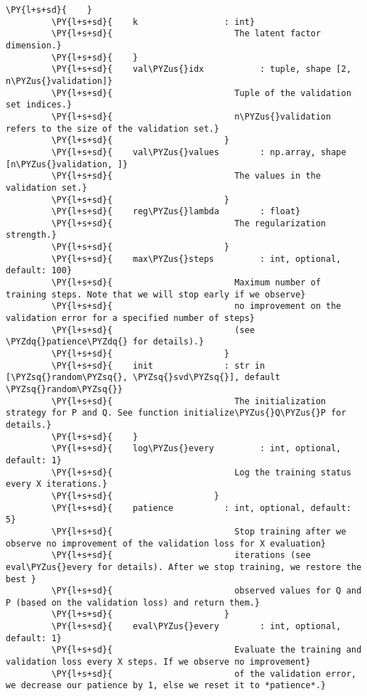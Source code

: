 \begin{Verbatim}[commandchars=\\\{\}]
         \PY{l+s+sd}{    }
         \PY{l+s+sd}{    k                 : int}
         \PY{l+s+sd}{                        The latent factor dimension.}
         \PY{l+s+sd}{    }
         \PY{l+s+sd}{    val\PYZus{}idx           : tuple, shape [2, n\PYZus{}validation]}
         \PY{l+s+sd}{                        Tuple of the validation set indices.}
         \PY{l+s+sd}{                        n\PYZus{}validation refers to the size of the validation set.}
         \PY{l+s+sd}{                      }
         \PY{l+s+sd}{    val\PYZus{}values        : np.array, shape [n\PYZus{}validation, ]}
         \PY{l+s+sd}{                        The values in the validation set.}
         \PY{l+s+sd}{                      }
         \PY{l+s+sd}{    reg\PYZus{}lambda        : float}
         \PY{l+s+sd}{                        The regularization strength.}
         \PY{l+s+sd}{                      }
         \PY{l+s+sd}{    max\PYZus{}steps         : int, optional, default: 100}
         \PY{l+s+sd}{                        Maximum number of training steps. Note that we will stop early if we observe}
         \PY{l+s+sd}{                        no improvement on the validation error for a specified number of steps}
         \PY{l+s+sd}{                        (see \PYZdq{}patience\PYZdq{} for details).}
         \PY{l+s+sd}{                      }
         \PY{l+s+sd}{    init              : str in [\PYZsq{}random\PYZsq{}, \PYZsq{}svd\PYZsq{}], default \PYZsq{}random\PYZsq{}}
         \PY{l+s+sd}{                        The initialization strategy for P and Q. See function initialize\PYZus{}Q\PYZus{}P for details.}
         \PY{l+s+sd}{    }
         \PY{l+s+sd}{    log\PYZus{}every         : int, optional, default: 1}
         \PY{l+s+sd}{                        Log the training status every X iterations.}
         \PY{l+s+sd}{                    }
         \PY{l+s+sd}{    patience          : int, optional, default: 5}
         \PY{l+s+sd}{                        Stop training after we observe no improvement of the validation loss for X evaluation}
         \PY{l+s+sd}{                        iterations (see eval\PYZus{}every for details). After we stop training, we restore the best }
         \PY{l+s+sd}{                        observed values for Q and P (based on the validation loss) and return them.}
         \PY{l+s+sd}{                      }
         \PY{l+s+sd}{    eval\PYZus{}every        : int, optional, default: 1}
         \PY{l+s+sd}{                        Evaluate the training and validation loss every X steps. If we observe no improvement}
         \PY{l+s+sd}{                        of the validation error, we decrease our patience by 1, else we reset it to *patience*.}
         

\end{Verbatim}
